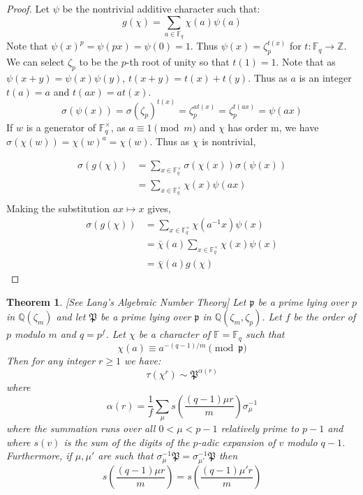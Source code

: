 \documentclass{article}
\newcommand{\Z}{\mathbb{Z}}
\newcommand{\Q}{\mathbb{Q}}
\newcommand{\F}{\mathbb{F}}
\newtheorem{theorem}{Theorem}[section]
\theoremstyle{definition}
\theoremstyle{definition}
\theoremstyle{remark}
\begin{document}
\begin{proof}
Let $\psi$ be the nontrivial additive character such that:
\[g(\chi) = \sum_{a \in \F_q} \chi(a)\psi(a)\]
Note that $\psi(x)^p = \psi(px) = \psi(0) = 1$. Thus $\psi(x) = \zeta_p^{t(x)}$ for $t: \F_q \to \Z$. We can select $\zeta_p$ to be the $p$-th root of unity so that $t(1) = 1$. Note that as $\psi(x + y) = \psi(x)\psi(y)$, $t(x + y) = t(x) + t(y)$. Thus as $a$ is an integer $t(a) = a$ and $t(ax) = at(x)$.
\[\sigma(\psi(x)) = \sigma(\zeta_p)^{t(x)} = \zeta_p^{at(x)} = \zeta_p^{t(ax)} = \psi(ax)\]
If $w$ is a generator of $\F_q^{\times}$, as $a \equiv 1 \pmod m$ and $\chi$ has order m, we have $\sigma(\chi(w)) = \chi(w)^a = \chi(w)$. Thus as $\chi$ is nontrivial,

\begin{align*}
\sigma(g(\chi)) &= \sum_{x \in \F_q^{\times}} \sigma(\chi(x))\sigma(\psi(x)) \\
&= \sum_{x \in \F_q^{\times}} \chi(x)\psi(ax) \\
\end{align*}
Making the substitution $ax \mapsto x$ gives,
\begin{align*}
\sigma(g(\chi)) &= \sum_{x \in \F_q^{\times}} \chi(a^{-1}x)\psi(x) \\
&= \bar{\chi}(a)\sum_{x \in \F_q^{\times}} \chi(x)\psi(x) \\
&= \bar{\chi}(a)g(\chi)
\end{align*}
\end{proof}


\begin{theorem} \label{thm:gauss_fact_lang}[See Lang's Algebraic Number Theory]
Let $\mathfrak{p}$ be a prime lying over $p$ in $\Q(\zeta_{m})$ and let $\mathfrak{P}$ be a prime lying over $\mathfrak{p}$ in $\mathbb{Q}(\zeta_{m}, \zeta_p)$. Let $f$ be the order of $p$ modulo $m$ and $q = p^f$. Let $\chi$ be a character of $\F=\F_q$ such that
\[\chi(a) \equiv a^{-(q-1)/m} \pmod{\mathfrak{p}}\]
Then for any integer $r \ge 1$ we have:
\[\tau\left(\chi^r\right) \sim \mathfrak{P}^{\alpha(r)}\]
where 
\[\alpha(r) = \frac{1}{f}\sum_{\mu} s\left(\frac{(q-1)\mu r}{m}\right)\sigma_{\mu}^{-1}\]
where the summation runs over all $0 < \mu < p-1$ relatively prime to $p-1$ and where $s(v)$ is the sum of the digits of the $p$-adic expansion of $v$ modulo $q - 1$. Furthermore, if $\mu, \mu'$ are such that $\sigma_{\mu}^{-1}\mathfrak{P} = \sigma_{\mu'}^{-1}\mathfrak{P}$ then
\[s\left(\frac{(q-1)\mu r}{m}\right) = s\left(\frac{(q-1)\mu' r}{m}\right)\]
\end{theorem}
\end{document}
